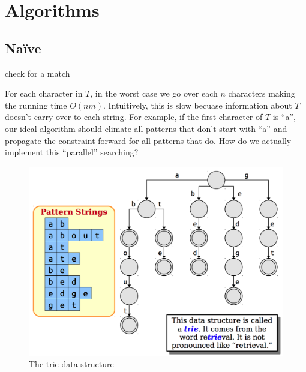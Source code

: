 \documentclass[11pt, oneside]{article}
\begin{document}
\newpage

\section{Algorithms}
\subsection{Naïve}

\begin{algorithm}
  \begin{algorithmic}[h!]
            \State check for a match
          \EndFor
      \EndFor
    \EndProcedure
  \end{algorithmic}
\end{algorithm}

For each character in \( T \), in the worst case we go over each \( n \)
characters making the running time \( O(nm) \). Intuitively, this is slow
becuase information about \( T \) doesn't carry over to each string.
For example, if the first character of \( T \) is ``a'', our ideal algorithm should
elimate all patterns that don't start with ``a'' and propagate the constraint
forward for all patterns that do. How do we actually implement this ``parallel'' searching?

\begin{figure}[h!]
\centering
\includegraphics[scale=0.25]{trie}
\caption{The trie data structure}
\end{figure}
\end{document}
